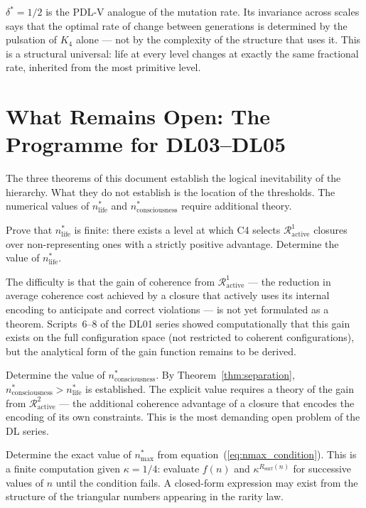 \documentclass[12pt,a4paper]{article}
\newenvironment{openproblem}[1][]{%
  \begin{tcolorbox}[openproblemstyle,title={Open Problem%
    \ifx\relax#1\relax\else: #1\fi}]}{\end{tcolorbox}}
\theoremstyle{plain}
\theoremstyle{definition}
\theoremstyle{remark}
\newcommand{\Kfour}{K_4}
\newcommand{\Rop}{\mathcal{R}}
\newcommand{\kap}{\kappa}
\newcommand{\nlife}{n^{*}_{\mathrm{life}}}
\newcommand{\ncons}{n^{*}_{\mathrm{consciousness}}}
\newcommand{\nmax}{n^{*}_{\mathrm{max}}}
\newcommand{\deltastar}{\delta^{*}}
\begin{document}
$\deltastar = 1/2$ is the PDL-V analogue of the mutation rate. Its invariance across
scales says that the optimal rate of change between generations is determined by the
pulsation of $\Kfour$ alone --- not by the complexity of the structure that uses it.
This is a structural universal: life at every level changes at exactly the same
fractional rate, inherited from the most primitive level.

\section{What Remains Open: The Programme for DL03--DL05}
\label{sec:open}

The three theorems of this document establish the logical inevitability of the
hierarchy. What they do not establish is the location of the thresholds. The
numerical values of $\nlife$ and $\ncons$ require additional theory.

\begin{openproblem}[Existence and value of $\nlife$ --- DL03]
Prove that $\nlife$ is finite: there exists a level at which C4 selects
$\Rop^1_{\mathrm{active}}$ closures over non-representing ones with a strictly
positive advantage. Determine the value of $\nlife$.

The difficulty is that the gain of coherence from $\Rop^1_{\mathrm{active}}$ --- the
reduction in average coherence cost achieved by a closure that actively uses its
internal encoding to anticipate and correct violations --- is not yet formulated as a
theorem. Scripts~6--8 of the DL01 series showed computationally that this gain exists
on the full configuration space (not restricted to coherent configurations), but the
analytical form of the gain function remains to be derived.
\end{openproblem}

\begin{openproblem}[Value of $\ncons$ --- DL04--DL05]
Determine the value of $\ncons$. By Theorem~\ref{thm:separation}, $\ncons > \nlife$
is established. The explicit value requires a theory of the gain from
$\Rop^2_{\mathrm{active}}$ --- the additional coherence advantage of a closure that
encodes the encoding of its own constraints. This is the most demanding open problem
of the DL series.
\end{openproblem}

\begin{openproblem}[Explicit value of $\nmax$]
Determine the exact value of $\nmax$ from equation~(\ref{eq:nmax_condition}). This
is a finite computation given $\kap = 1/4$: evaluate $f(n)$ and $\kap^{R_{\mathrm{surf}}(n)}$
for successive values of $n$ until the condition fails. A closed-form expression may
exist from the structure of the triangular numbers appearing in the rarity law.
\end{openproblem}
\end{document}
